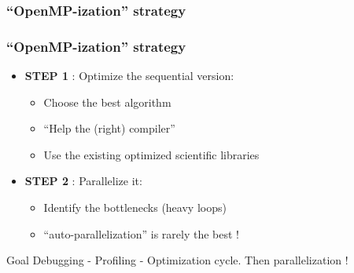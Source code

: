 \subsubsection{``OpenMP-ization'' strategy}


\begin{frame}
\frametitle{``OpenMP-ization'' strategy}

\begin{itemize}
\item {\textbf{STEP 1} : Optimize the sequential version:
        \begin{itemize}
        \item {Choose the best algorithm}
        \item {``Help the (right) compiler''}
        \item {Use the existing optimized scientific libraries}
        \end{itemize}
}
\item {\textbf{STEP 2} : Parallelize it:
        \begin{itemize}
        \item {Identify the bottlenecks (heavy loops)}
        \item {``auto-parallelization'' is rarely the best !}
        \end{itemize}
}
\end{itemize}

\begin{alertblock}{Goal}
Debugging - Profiling - Optimization cycle. Then parallelization !
\end{alertblock}


\end{frame}

